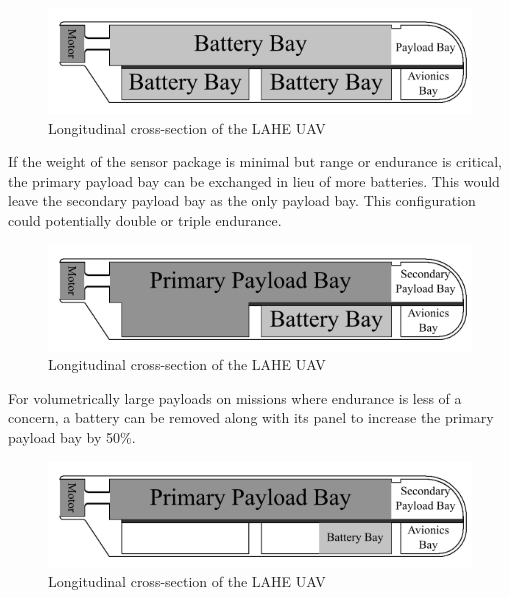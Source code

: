 \documentclass[12pt]{article}
\begin{document}
	\begin{figure}[h!]
		\centering
		\includegraphics[width=6 in]{Media/UltraEnduranceConfig.png} %
		\caption{Longitudinal cross-section of the LAHE UAV}
	\end{figure}
	
	If the weight of the sensor package is minimal but range or endurance is critical, the primary payload bay can be exchanged in lieu of more batteries. This would leave the secondary payload bay as the only payload bay. This configuration could potentially double or triple endurance.
	
	\newpage
	
	\begin{figure}[h!]
		\centering
		\includegraphics[width=6 in]{Media/HighPayloadConfig.png} %
		\caption{Longitudinal cross-section of the LAHE UAV}
	\end{figure}
	
	For volumetrically large payloads on missions where endurance is less of a concern, a battery can be removed along with its panel to increase the primary payload bay by 50\%.
	
	\begin{figure}[h!]
		\centering
		\includegraphics[width=6 in]{Media/HighDensityPayloadConfig.png} %
		\caption{Longitudinal cross-section of the LAHE UAV}
	\end{figure}
	
\end{document}
